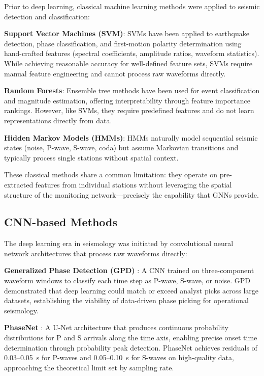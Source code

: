 \documentclass[review,authoryear]{elsarticle}
\begin{document}
Prior to deep learning, classical machine learning methods were applied to seismic detection and classification:

\textbf{Support Vector Machines (SVM)}: SVMs have been applied to earthquake detection, phase classification, and first-motion polarity determination using hand-crafted features (spectral coefficients, amplitude ratios, waveform statistics). While achieving reasonable accuracy for well-defined feature sets, SVMs require manual feature engineering and cannot process raw waveforms directly.

\textbf{Random Forests}: Ensemble tree methods have been used for event classification and magnitude estimation, offering interpretability through feature importance rankings. However, like SVMs, they require predefined features and do not learn representations directly from data.

\textbf{Hidden Markov Models (HMMs)}: HMMs naturally model sequential seismic states (noise, P-wave, S-wave, coda) but assume Markovian transitions and typically process single stations without spatial context.

These classical methods share a common limitation: they operate on pre-extracted features from individual stations without leveraging the spatial structure of the monitoring network---precisely the capability that GNNs provide.

\subsection{CNN-based Methods}

The deep learning era in seismology was initiated by convolutional neural network architectures that process raw waveforms directly:

\textbf{Generalized Phase Detection (GPD)} \citep{ross2018generalized}: A CNN trained on three-component waveform windows to classify each time step as P-wave, S-wave, or noise. GPD demonstrated that deep learning could match or exceed analyst picks across large datasets, establishing the viability of data-driven phase picking for operational seismology.

\textbf{PhaseNet} \citep{zhu2019phasenet}: A U-Net architecture that produces continuous probability distributions for P and S arrivals along the time axis, enabling precise onset time determination through probability peak detection. PhaseNet achieves residuals of 0.03--0.05~s for P-waves and 0.05--0.10~s for S-waves on high-quality data, approaching the theoretical limit set by sampling rate.
\end{document}
